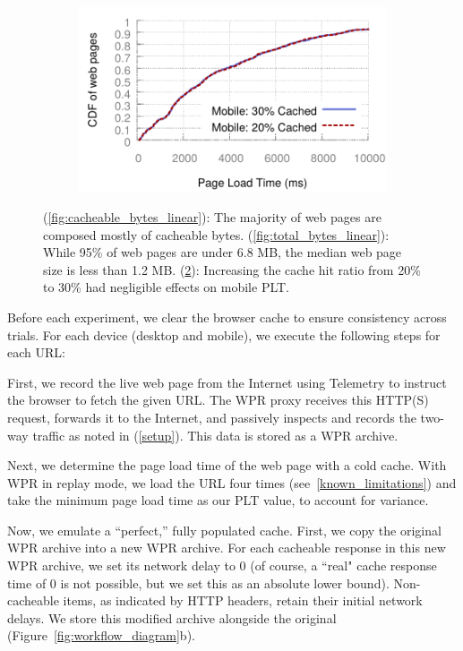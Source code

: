 \begin{figure}[!htb]
\begin{subfigure}{0.33\textwidth}
    \includegraphics[width=\textwidth]{../graphs/partial_cache/partial_cache_linear_PLT.pdf}
    \caption[]{\label{fig:partial_cache_linear}}
\end{subfigure}\hfill
\caption{(\ref{fig:cacheable_bytes_linear}): The majority of web pages are composed mostly of cacheable bytes. (\ref{fig:total_bytes_linear}): While 95\% of web pages are under 6.8 MB, the median web page size is less than 1.2 MB. (\ref{fig:partial_cache_linear}): Increasing the cache hit ratio from 20\% to 30\% had negligible effects on mobile PLT.}
\end{figure}
Before each experiment, we clear the browser cache to ensure consistency across trials. For each device (desktop and mobile), we execute the following steps for each URL:

First, we record the live web page from the Internet using Telemetry to instruct the browser to fetch the given URL. The WPR proxy receives this HTTP(S) request, forwards it to the Internet, and passively inspects and records the two-way traffic as noted in (\ref{setup}). This data is stored as a WPR archive.

Next, we determine the page load time of the web page with a cold cache. With WPR in replay mode, we load the URL four times (see~\ref{known_limitations}) and take the minimum page load time as our PLT value, to account for variance.

Now, we emulate a ``perfect,'' fully populated cache. First, we copy the original WPR archive into a new WPR archive. For each cacheable response in this new WPR archive, we set its network delay to 0 (of course, a ``real" cache response time of 0 is not possible, but we set this as an absolute lower bound). Non-cacheable items, as indicated by HTTP headers, retain their initial network delays. We store this modified archive alongside the original (Figure~\ref{fig:workflow_diagram}b).

